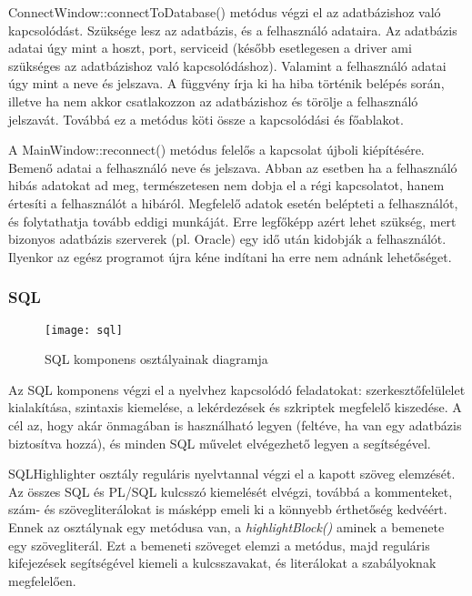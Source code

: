 ConnectWindow::connectToDatabase() metódus végzi el az adatbázishoz való kapcsolódást. Szüksége lesz az adatbázis, és a felhasználó adataira.
Az adatbázis adatai úgy mint a hoszt, port, serviceid (később esetlegesen a driver ami szükséges az adatbázishoz való kapcsolódáshoz). Valamint a 
felhasználó adatai úgy mint a neve és jelszava. A függvény írja ki ha hiba történik belépés során, illetve ha nem akkor csatlakozzon az adatbázishoz
és törölje a felhasználó jelszavát. Továbbá ez a metódus köti össze a kapcsolódási és főablakot.

A MainWindow::reconnect() metódus felelős a kapcsolat újboli kiépítésére. Bemenő adatai a felhasználó neve és jelszava. Abban az esetben ha a felhasználó
hibás adatokat ad meg, természetesen nem dobja el a régi kapcsolatot, hanem értesíti a felhasználót a hibáról. Megfelelő adatok esetén belépteti a felhasználót,
és folytathatja tovább eddigi munkáját. Erre legfőképp azért lehet szükség, mert bizonyos adatbázis szerverek (pl. Oracle) egy idő után kidobják a felhasználót.
Ilyenkor az egész programot újra kéne indítani ha erre nem adnánk lehetőséget.

\subsubsection{SQL}

\begin{figure}[ht]
  \begin{center}
  \texttt{[image: sql]}
  \end{center}
 \caption{SQL komponens osztályainak diagramja}
\end{figure}

Az SQL komponens végzi el a nyelvhez kapcsolódó feladatokat: szerkesztőfelülelet kialakítása, szintaxis kiemelése, a lekérdezések és szkriptek
megfelelő kiszedése. A cél az, hogy akár önmagában is használható legyen (feltéve, ha van egy adatbázis biztosítva hozzá), és minden SQL művelet
elvégezhető legyen a segítségével.

SQLHighlighter osztály reguláris nyelvtannal végzi el a kapott szöveg elemzését. Az összes SQL és PL/SQL kulcsszó\cite{sqlwords} kiemelését
elvégzi, továbbá a kommenteket, szám- és szövegliterálokat is másképp emeli ki a könnyebb érthetőség kedvéért.
Ennek az osztálynak egy metódusa van, a \textit{highlightBlock()} aminek a bemenete egy szövegliterál. Ezt a bemeneti szöveget elemzi a metódus,
majd reguláris kifejezések segítségével kiemeli a kulcsszavakat, és literálokat a szabályoknak megfelelően.

